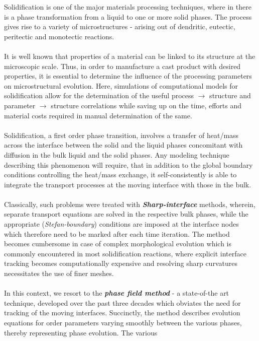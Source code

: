 \documentclass[12pt,a4paper]{report}
\begin{document}
Solidification is one of the major materials processing techniques, 
where in there is a phase transformation from a liquid to one or more solid phases. 
The process gives rise to a variety of microstructures - arising out of dendritic, eutectic, 
peritectic and monotectic reactions.\\
\\
It is well known that properties of a material can be linked to its structure at the microscopic 
scale. Thus, in order to manufacture a cast product with desired properties, it is essential to 
determine the influence of the processing parameters on microstructural evolution. Here, simulations of 
computational models for solidification allow for the determination of the useful process 
$\rightarrow$ structure and parameter $\rightarrow$ structure correlations while saving up on the 
time, efforts and material costs required in manual determination of the same.\\
\\
Solidification, a first order phase transition, involves a transfer of heat/mass across the 
interface between the solid and the liquid phases concomitant with diffusion in the bulk liquid and the solid 
phases. Any modeling technique describing this phenomenon will require, that in addition to the global boundary 
conditions controlling the heat/mass exchange, it self-consistently is able to integrate the transport processes 
at the moving interface with those in the bulk.\\
\\
Classically, such problems were treated with \textbf{\textit{Sharp-interface}} methods, wherein, separate transport
equations are solved in the respective bulk phases, while the appropriate (\textit{Stefan-boundary}) conditions
are imposed at the interface nodes which therefore need to be marked after each time iteration. 
The method becomes cumbersome in case of complex morphological evolution which is commonly encountered
in most solidification reactions, where explicit interface tracking becomes computationally expensive and
resolving sharp curvatures necessitates the use of finer meshes.\\
\\
In this context, we resort to the \textbf{\textit{phase field method}} - a state-of-the art technique, 
developed over the past three decades which obviates the need for tracking of the moving interfaces.
Succinctly, the method describes evolution equations for order parameters varying
smoothly between the various phases, thereby representing phase evolution. The various 
\end{document}
